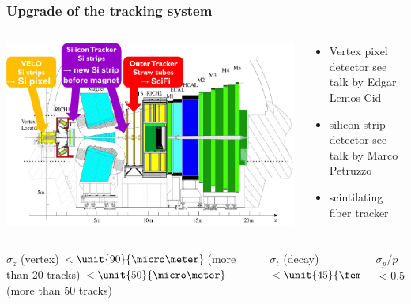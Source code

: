 \documentclass[table,xcolor=dvipsnames,professionalfonts]{beamer}
\begin{document}
    \begin{frame}
      \frametitle{Upgrade of the tracking system}
      \begin{columns}
        \begin{column}{.7\textwidth}
          \includegraphics[width=\textwidth]{./LHCb2.pdf}
        \end{column}
        \begin{column}{.3\textwidth}
            \begin{itemize}
              \item Vertex pixel detector
                \newline see talk by Edgar Lemos Cid
              \item silicon strip detector
                \newline see talk by Marco Petruzzo
              \item scintilating fiber tracker
            \end{itemize}
          \end{column}
        \end{columns}
        \begin{columns}
        \begin{column}{.3\textwidth}
          \begin{block}{$\sigma_z$ (vertex)}
            $<\unit{90}{\micro\meter}$\newline \small{(more than 20 tracks)}
            $<\unit{50}{\micro\meter}$\newline \small{(more than 50 tracks)}
          \end{block}
          \end{column}
        \begin{column}{.3\textwidth}
          \begin{block}{$\sigma_t$ (decay)}
            $<\unit{45}{\femto\second}$
          \end{block}
          \end{column}
        \begin{column}{.3\textwidth}
          \begin{block}{$\sigma_p/p$}
            $<0.5\,\%$
          \end{block}
          \end{column}
        \end{columns}
      \end{frame}
\end{document}
